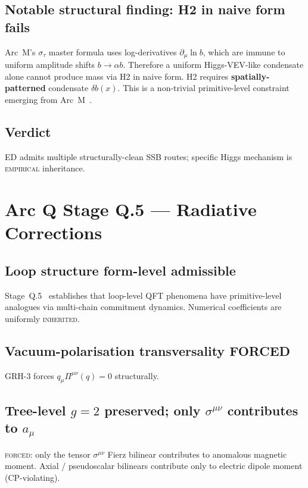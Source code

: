 \documentclass[11pt,a4paper]{article}
\begin{document}
\subsection{Notable structural finding: H2 in naive form fails}

Arc~M's $\sigma_\tau$ master formula uses log-derivatives $\partial_\mu \ln b$, which are immune to uniform amplitude shifts $b \to \alpha b$. Therefore a uniform Higgs-VEV-like condensate alone cannot produce mass via H2 in naive form. H2 requires \textbf{spatially-patterned} condensate $\delta b(x)$. This is a non-trivial primitive-level constraint emerging from Arc~M~\cite{arcm}.

\subsection{Verdict}

ED admits multiple structurally-clean SSB routes; specific Higgs mechanism is \textsc{empirical} inheritance.

\section{Arc Q Stage Q.5 --- Radiative Corrections}

\subsection{Loop structure form-level admissible}

Stage~Q.5~\cite{q5rad} establishes that loop-level QFT phenomena have primitive-level analogues via multi-chain commitment dynamics. Numerical coefficients are uniformly \textsc{inherited}.

\subsection{Vacuum-polarisation transversality FORCED}

GRH-3 forces $q_\mu \Pi^{\mu\nu}(q) = 0$ structurally.

\subsection{Tree-level $g = 2$ preserved; only $\sigma^{\mu\nu}$ contributes to $a_\mu$}

\textsc{forced}: only the tensor $\sigma^{\mu\nu}$ Fierz bilinear contributes to anomalous magnetic moment. Axial / pseudoscalar bilinears contribute only to electric dipole moment (CP-violating).
\end{document}
